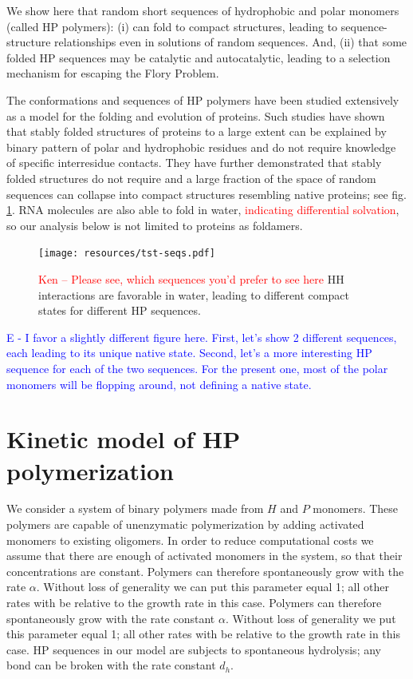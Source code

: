 \documentclass[journal=jacsat,manuscript=article,layout=twocolumn]{achemso}
\newcommand*{\ga}{\alpha}
\newcommand*{\red}[1]{\textcolor{red}{#1}}
\newcommand*{\blue}[1]{\textcolor{blue}{#1}}
\begin{document}
We show here that random short sequences of hydrophobic and polar monomers (called HP polymers): (i) 
can fold to compact structures, leading to sequence-structure relationships even in solutions of 
random sequences.  And, (ii) that some folded HP sequences may be catalytic and autocatalytic, 
leading to a selection mechanism for escaping the Flory Problem.  

The conformations and sequences of HP polymers have been studied extensively as a model for the 
folding and evolution of 
proteins\cite{lau1989lattice,Chan1991,Miller1995,Yue1995,agarwala1997local}.  Such studies have 
shown that stably folded structures of proteins to a large extent can be 
explained by binary pattern of polar and hydrophobic residues and do not require knowledge of 
specific interresidue contacts\cite{Yue1992,Xiong1995,Fisher2011}. They have 
further demonstrated that stably folded structures do not require 
 and a large fraction of the space of random sequences can 
collapse into compact structures resembling native proteins\cite{lau1989lattice}; see fig. 
\ref{fig:hydro-effect}.  
RNA molecules are also able to fold in water, \red{indicating differential solvation}, so 
our analysis below is not limited to proteins as foldamers.

\begin{figure}[h!]
  \centering
  \texttt{[image: resources/tst-seqs.pdf]} 
  \caption{\red{Ken -- Please see, which sequences you'd prefer to see here} HH interactions are 
favorable in water, leading to different compact states for different 
HP sequences.}
  \label{fig:hydro-effect}
\end{figure}

\blue{E - I favor a slightly different figure here.  First, let's show 2 different sequences, 
each leading to its unique native state.  Second, let's a more interesting HP sequence for each of 
the two sequences.  For the present one, most of the polar monomers will be flopping around, not 
defining a native state.}



\section{Kinetic model of HP polymerization}

We consider a system of binary polymers made from $H$ and $P$ monomers. These polymers are capable 
of unenzymatic polymerization by adding activated monomers to existing oligomers. In order to 
reduce computational costs we assume that there are enough of activated monomers in the system, so 
that their concentrations are constant. Polymers can therefore spontaneously grow with the rate 
$\ga$. Without loss of generality we 
can put this parameter equal 1; all other rates with be relative to the growth rate in this case. 
Polymers can therefore spontaneously grow with the rate constant $\ga$. Without loss of generality 
we 
put this parameter equal 1; all other rates with be relative to the growth rate in this case. 
HP sequences in our model are subjects to spontaneous hydrolysis; any bond can be broken with the 
rate constant $d_h$.
\end{document}

